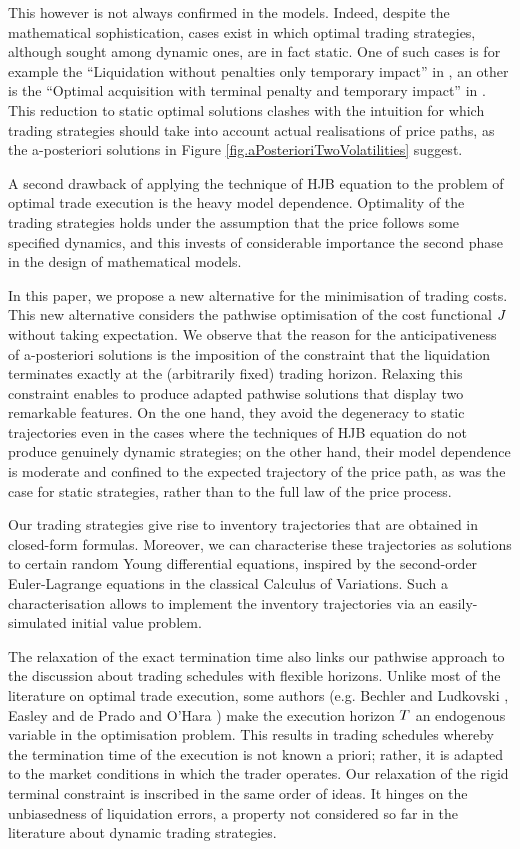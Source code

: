 \documentclass[10pt,a4paper]{article}
\begin{document}
This however is not always confirmed in the models. Indeed, despite the mathematical sophistication, cases exist in which  optimal trading strategies, although sought among dynamic ones, are in fact static. One of such cases is for example the ``Liquidation without penalties only temporary impact'' in  \cite[Section 6.3]{CJP15alg}, an other is the ``Optimal acquisition with terminal penalty and temporary impact'' in  \cite[Section 6.4]{CJP15alg}. This reduction to static optimal solutions clashes with the intuition for which trading strategies should take into account actual realisations of price paths, as the a-posteriori solutions in Figure \ref{fig.aPosterioriTwoVolatilities} suggest. 

A second drawback of applying  the technique of HJB equation to the problem of optimal trade execution is the heavy model dependence. Optimality of the trading strategies holds under the assumption that the price follows some specified dynamics, and this invests  of considerable importance the second phase in the design of mathematical models.  

In this paper, we propose a new alternative for the minimisation of trading costs. This new alternative considers the pathwise optimisation of the cost functional $J$ without taking expectation. We observe that the reason for the anticipativeness of a-posteriori solutions is the imposition of the constraint that the liquidation terminates exactly at the (arbitrarily fixed) trading horizon. Relaxing this constraint enables to produce adapted pathwise solutions that display two remarkable features. On the one hand, they avoid the degeneracy to static trajectories even in the cases where the techniques of HJB equation do not produce genuinely dynamic strategies; on the other hand, their model dependence is moderate and confined to the expected trajectory of the price path, as was the case for static strategies, rather than to the full law of the price process.

Our trading strategies give rise to inventory trajectories that are obtained in closed-form formulas. Moreover, we can characterise these trajectories as solutions to certain random Young differential equations, inspired   by the second-order Euler-Lagrange equations in the classical Calculus of Variations. Such a characterisation allows to implement the inventory trajectories via an easily-simulated initial value problem.

The relaxation of the exact termination time also links our pathwise approach to the discussion about trading schedules with flexible horizons. Unlike most of the literature on optimal trade execution, some authors (e.g. Bechler and Ludkovski \cite{BL15opt}, Easley and de Prado and O'Hara \cite{ED15opt})  make  the execution horizon  $T$ an  endogenous variable in the optimisation problem. This results in trading schedules whereby the termination time of the execution is not known a priori; rather, it is adapted to the market conditions in which the trader operates.  Our relaxation of the rigid terminal constraint is inscribed in the same order of ideas. It hinges on the unbiasedness of liquidation errors, a property not considered so far in the literature about dynamic trading strategies. 
\end{document}
